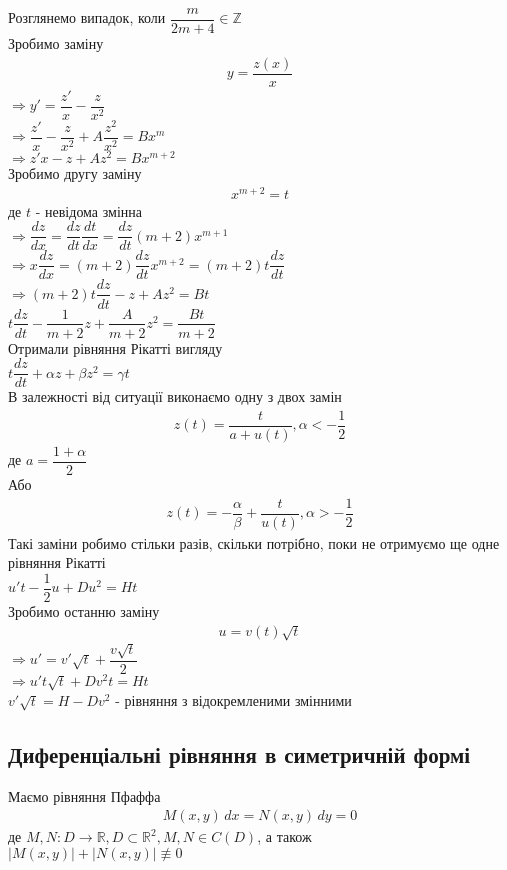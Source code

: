 \documentclass[a4paper, 10pt]{article}
\theoremstyle{theoremdd}
\theoremstyle{theoremdd}
\theoremstyle{theoremdd}
\theoremstyle{theoremdd}
\theoremstyle{theoremdd}
\theoremstyle{theoremdd}
\theoremstyle{theoremdd}
\theoremstyle{theoremdd}
\begin{document}
Розглянемо випадок, коли $\dfrac{m}{2m+4} \in \mathbb{Z}$\\
Зробимо заміну
\begin{align*}
y = \dfrac{z(x)}{x}
\end{align*}
$\Rightarrow y' = \dfrac{z'}{x} - \dfrac{z}{x^2}$\\
$\Rightarrow \dfrac{z'}{x} - \dfrac{z}{x^2} + A \dfrac{z^2}{x^2} = Bx^m$\\
$\Rightarrow z'x - z + Az^2 = Bx^{m+2}$\\
Зробимо другу заміну
\begin{align*}
x^{m+2} = t
\end{align*}
де $t$ - невідома змінна\\
$\Rightarrow \dfrac{dz}{dx} = \dfrac{dz}{dt} \dfrac{dt}{dx} = \dfrac{dz}{dt} (m+2)x^{m+1}$\\
$\Rightarrow x \dfrac{dz}{dx} = (m+2) \dfrac{dz}{dt} x^{m+2} = (m+2)t \dfrac{dz}{dt}$\\
$\Rightarrow (m+2)t \dfrac{dz}{dt} - z + Az^2 = Bt$\\
$t \dfrac{dz}{dt} - \dfrac{1}{m+2}z + \dfrac{A}{m+2}z^2 = \dfrac{Bt}{m+2}$\\
Отримали рівняння Рікатті вигляду\\
$t \dfrac{dz}{dt} + \alpha z + \beta z^2 = \gamma t$\\
В залежності від ситуації виконаємо одну з двох замін
\begin{align*}
z(t) = \dfrac{t}{a+u(t)}, \alpha < -\dfrac{1}{2}
\end{align*}
де $a = \dfrac{1+\alpha}{2}$\\
Або
\begin{align*}
z(t) = -\dfrac{\alpha}{\beta} + \dfrac{t}{u(t)}, \alpha > -\dfrac{1}{2}
\end{align*}
Такі заміни робимо стільки разів, скільки потрібно, поки не отримуємо ще одне рівняння Рікатті\\
$u't - \dfrac{1}{2}u + Du^2 = Ht$\\
Зробимо останню заміну
\begin{align*}
u = v(t) \sqrt{t}
\end{align*}
$\Rightarrow u' = v' \sqrt{t} + \dfrac{v \sqrt{t}}{2}$\\
$\Rightarrow u' t \sqrt{t} + Dv^2t = Ht$\\
$v' \sqrt{t} = H - Dv^2$ - рівняння з відокремленими змінними
\bigskip \\

\subsection{Диференціальні рівняння в симетричній формі}
Маємо рівняння Пфаффа
\begin{align*}
M(x,y)\,dx = N(x,y)\,dy = 0
\end{align*}
де $M,N\colon D \to \mathbb{R}, D \subset \mathbb{R}^2, M,N \in C(D)$, а також\\
$|M(x,y)|+|N(x,y)| \not\equiv 0$
\end{document}
